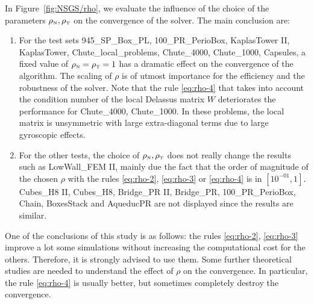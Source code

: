 In Figure~\ref{fig:NSGS/rho}, we evaluate the influence of the choice of the parameters $\rho_{\hbox{\tiny{N}}}, \rho_{\hbox{\tiny{T}}}$ on the convergence of the solver. The main conclusion are:
\begin{enumerate}
\item For the test sets 945\_SP\_Box\_PL, 100\_PR\_PerioBox, KaplasTower II, KaplasTower, Chute\_local\_problems, Chute\_4000, Chute\_1000, Capsules, a fixed value of $\rho_{\hbox{\tiny{N}}}=\rho_{\hbox{\tiny{T}}}=1$ has a dramatic effect on the convergence of the algorithm. The scaling of $\rho$ is of utmost importance for the efficiency and the robustness of the solver. Note that the rule  \eqref{eq:rho-4} that takes into account the condition number of the local Delassus matrix $W$ deteriorates the performance for  Chute\_4000, Chute\_1000. In these problems, the local matrix is unsymmetric with large extra-diagonal terms due to large gyroscopic effects.
  
\item For the other tests, the choice of $\rho_{\hbox{\tiny{N}}},\rho_{\hbox{\tiny{T}}}$ does not really change the results such as LowWall\_FEM II, mainly due the fact that the order of magnitude of the chosen $\rho$ with the rules \eqref{eq:rho-2}, \eqref{eq:rho-3} or \eqref{eq:rho-4} is in $[10^{-01}, 1]$. Cubes\_H8 II, Cubes\_H8, Bridge\_PR II, Bridge\_PR, 100\_PR\_PerioBox, Chain, BoxesStack and AqueducPR are not displayed since the results are similar.
\end{enumerate}
One of the conclusions of this study is as follows: the rules \eqref{eq:rho-2}, \eqref{eq:rho-3} improve a lot some simulations without increasing the computational cost for the others. Therefore, it is strongly advised to use them. Some further theoretical studies are needed to understand the effect of $\rho$ on the convergence. In particular, the rule \eqref{eq:rho-4} is usually better, but sometimes completely destroy the convergence.
